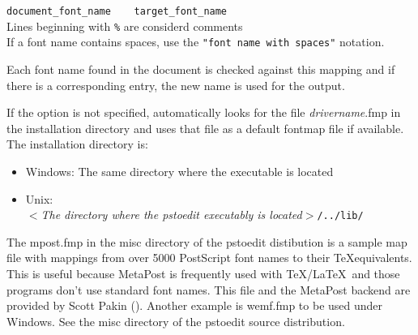 \documentclass[english,a4paper]{article}
\begin{document}
\begin{description}
\verb+document_font_name    target_font_name+ \\
Lines beginning with \verb+%+ are considerd comments \\
 If a font name contains spaces, use the \verb+"font name with spaces"+ notation. 
 
Each font name found in the document is checked against this mapping and if there is a corresponding entry, the new name is used for the output.  

If  the  option is not specified,  automatically looks for the file \emph{drivername}.fmp in the installation directory and uses that file as a default fontmap file if available. The installation directory is:  

\begin{itemize} 
 
\item Windows: The same directory where the  executable is 
    located  
 
\item Unix: \\ 
$<$\emph{The directory where the pstoedit executably is located}$>$\verb+/../lib/+ 
 
\end{itemize} 
 
The mpost.fmp in the misc directory of the pstoedit distibution is a sample map file with mappings from over 5000 PostScript font names to their \TeX equivalents. This is useful because MetaPost is frequently used with \TeX/\LaTeX\ and those programs don't use standard font names. This file and the MetaPost backend are provided by Scott Pakin ().   Another example is wemf.fmp to be used under Windows. See the misc directory of the pstoedit source distribution. 


\end{description}
\end{document}
